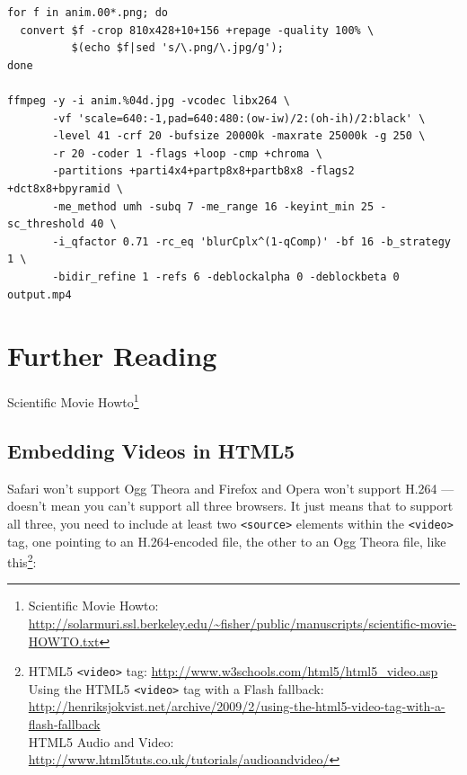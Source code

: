 \begin{description}
\begin{verbatim}
for f in anim.00*.png; do
  convert $f -crop 810x428+10+156 +repage -quality 100% \
          $(echo $f|sed 's/\.png/\.jpg/g');
done

ffmpeg -y -i anim.%04d.jpg -vcodec libx264 \
       -vf 'scale=640:-1,pad=640:480:(ow-iw)/2:(oh-ih)/2:black' \
       -level 41 -crf 20 -bufsize 20000k -maxrate 25000k -g 250 \
       -r 20 -coder 1 -flags +loop -cmp +chroma \
       -partitions +parti4x4+partp8x8+partb8x8 -flags2 +dct8x8+bpyramid \
       -me_method umh -subq 7 -me_range 16 -keyint_min 25 -sc_threshold 40 \
       -i_qfactor 0.71 -rc_eq 'blurCplx^(1-qComp)' -bf 16 -b_strategy 1 \
       -bidir_refine 1 -refs 6 -deblockalpha 0 -deblockbeta 0 output.mp4
\end{verbatim}

\end{description}

\section{Further Reading}

Scientific Movie Howto\footnote{Scientific Movie Howto: \url{http://solarmuri.ssl.berkeley.edu/~fisher/public/manuscripts/scientific-movie-HOWTO.txt}}

\subsection{Embedding Videos in HTML5}

Safari won’t  support Ogg Theora and  Firefox and Opera won’t  support H.264 —
doesn’t  mean you  can’t support  all three  browsers. It  just means  that to
support    all    three,    you    need    to    include    at    least    two
\texttt{{\textless}source{\textgreater}}       elements       within       the
\texttt{{\textless}video{\textgreater}} tag, one  pointing to an H.264-encoded
file,   the  other   to   an  Ogg   Theora   file,  like   this\footnote{HTML5
\texttt{{\textless}video{\textgreater}}                                    tag:
\url{http://www.w3schools.com/html5/html5_video.asp}\\    Using    the   HTML5
\texttt{{\textless}video{\textgreater}}    tag   with   a    Flash   fallback:
\url{http://henriksjokvist.net/archive/2009/2/using-the-html5-video-tag-with-a-flash-fallback}\\
HTML5                    Audio                    and                   Video:
\url{http://www.html5tuts.co.uk/tutorials/audioandvideo/} }:

